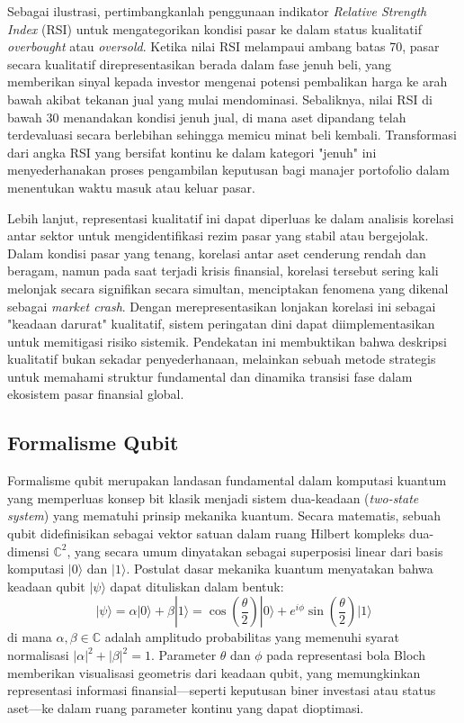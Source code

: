 \begin{example}
    Sebagai ilustrasi, pertimbangkanlah penggunaan indikator \textit{Relative Strength Index} (RSI) untuk mengategorikan kondisi pasar ke dalam status kualitatif \textit{overbought} atau \textit{oversold}. Ketika nilai RSI melampaui ambang batas 70, pasar secara kualitatif direpresentasikan berada dalam fase jenuh beli, yang memberikan sinyal kepada investor mengenai potensi pembalikan harga ke arah bawah akibat tekanan jual yang mulai mendominasi. Sebaliknya, nilai RSI di bawah 30 menandakan kondisi jenuh jual, di mana aset dipandang telah terdevaluasi secara berlebihan sehingga memicu minat beli kembali. Transformasi dari angka RSI yang bersifat kontinu ke dalam kategori "jenuh" ini menyederhanakan proses pengambilan keputusan bagi manajer portofolio dalam menentukan waktu masuk atau keluar pasar.

    Lebih lanjut, representasi kualitatif ini dapat diperluas ke dalam analisis korelasi antar sektor untuk mengidentifikasi rezim pasar yang stabil atau bergejolak. Dalam kondisi pasar yang tenang, korelasi antar aset cenderung rendah dan beragam, namun pada saat terjadi krisis finansial, korelasi tersebut sering kali melonjak secara signifikan secara simultan, menciptakan fenomena yang dikenal sebagai \textit{market crash}. Dengan merepresentasikan lonjakan korelasi ini sebagai "keadaan darurat" kualitatif, sistem peringatan dini dapat diimplementasikan untuk memitigasi risiko sistemik. Pendekatan ini membuktikan bahwa deskripsi kualitatif bukan sekadar penyederhanaan, melainkan sebuah metode strategis untuk memahami struktur fundamental dan dinamika transisi fase dalam ekosistem pasar finansial global.
\end{example}

\subsection{Formalisme Qubit}

Formalisme qubit merupakan landasan fundamental dalam komputasi kuantum yang memperluas konsep bit klasik menjadi sistem dua-keadaan (\textit{two-state system}) yang mematuhi prinsip mekanika kuantum. Secara matematis, sebuah qubit didefinisikan sebagai vektor satuan dalam ruang Hilbert kompleks dua-dimensi $\mathbb{C}^2$, yang secara umum dinyatakan sebagai superposisi linear dari basis komputasi $|0\rangle$ dan $|1\rangle$. Postulat dasar mekanika kuantum menyatakan bahwa keadaan qubit $|\psi\rangle$ dapat dituliskan dalam bentuk:
\begin{equation}
    |\psi\rangle = \alpha|0\rangle + \beta|1\rangle = \cos\left(\frac{\theta}{2}\right)|0\rangle + e^{i\phi}\sin\left(\frac{\theta}{2}\right)|1\rangle
\end{equation}
di mana $\alpha, \beta \in \mathbb{C}$ adalah amplitudo probabilitas yang memenuhi syarat normalisasi $|\alpha|^2 + |\beta|^2 = 1$. Parameter $\theta$ dan $\phi$ pada representasi bola Bloch memberikan visualisasi geometris dari keadaan qubit, yang memungkinkan representasi informasi finansial—seperti keputusan biner investasi atau status aset—ke dalam ruang parameter kontinu yang dapat dioptimasi.


